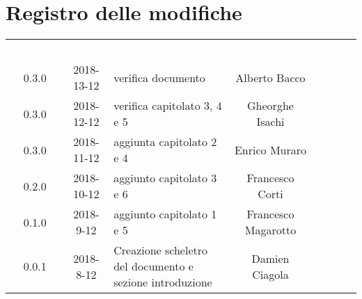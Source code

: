 
\section*{Registro delle modifiche}
{
	\renewcommand{\arraystretch}{1.5}
	\centering
	\begin{longtable}{ c c  C{4cm}  c  c }
		\textcolor{white}{\textbf{Versione}} & \textcolor{white}{\textbf{Data}} & \textcolor{white}{\textbf{Descrizione}} & \textcolor{white}{\textbf{Nominativo}} & \textcolor{white}{\textbf{Ruolo}}\\
		0.3.0 & 2018-13-12 & verifica documento & Alberto Bacco & \ver{} \\
		0.3.0 & 2018-12-12 & verifica capitolato 3, 4 e 5 & Gheorghe Isachi & \ver{}\\
		0.3.0 & 2018-11-12 &  aggiunta capitolato 2 e 4 & Enrico Muraro & \reda{}\\
		0.2.0 & 2018-10-12 & aggiunto capitolato 3 e 6 & Francesco Corti & \reda{}\\
		0.1.0 & 2018-9-12 & aggiunto capitolato 1 e 5 & Francesco Magarotto & \reda{} \\
		0.0.1 & 2018-8-12 & Creazione scheletro del documento e sezione introduzione & Damien Ciagola & \reda{}\\
	\end{longtable}

}